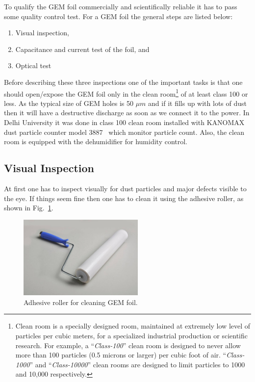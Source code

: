To qualify the GEM foil commercially and scientifically reliable it has to pass some quality control test. For a GEM foil the general steps are listed below:
\begin{enumerate}
    \item Visual inspection,
    \item Capacitance and current test of the foil, and
    \item Optical test
\end{enumerate}

Before describing these three inspections one of the important tasks is that one should open/expose the GEM foil only in the clean room\footnote{Clean room is a specially designed room, maintained at extremely low level of particles per cubic meters, for a specialized industrial production or scientific research. For example, a ``\textit{Class-100}'' clean room is designed to never allow more than 100 particles (0.5 microns or larger) per cubic foot of air. ``\textit{Class-1000}'' and ``\textit{Class-10000}'' clean rooms are designed to limit particles to 1000 and 10,000 respectively.} of at least class 100 or less.
As the typical size of GEM holes is 50 $\mu m$ and if it fills up with lots of dust then it will have a destructive discharge as soon as we connect it to the power.
In Delhi University it was done in class 100 clean room installed with KANOMAX dust particle counter model 3887~\cite{KANOMAX-dust-particle-counter} which monitor particle count.
Also, the clean room is equipped with the dehumidifier for humidity control.


\subsection{Visual Inspection} %
\label{sub:visual_inspection}
At first one has to inspect visually for dust particles and major defects visible to the eye.
If things seem fine then one has to clean it using the adhesive roller, as shown in Fig.~\ref{fig:adhesive_roller}.
\begin{figure}[htbp]
    \centering
    \includegraphics[width=0.55\textwidth]{figures/GEM/Adhesive_roller.jpg}
    \caption{Adhesive roller for cleaning GEM foil.}
    \label{fig:adhesive_roller}
\end{figure}

